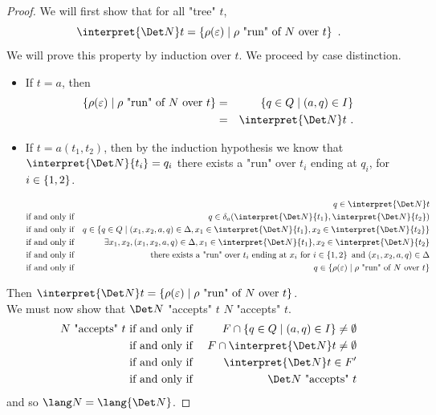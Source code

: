 \documentclass[twoside]{article}
\begin{document}
\begin{proof}
	We will first show that for all "tree" $t$,
	\[
		\interpret {\Det N} t = \setdef {\rho(\varepsilon)}{\text{$\rho$ "run" of~$N$ over~$t$}}\ .
	\]
	We will prove this property by induction over $t$. We proceed by case distinction.
	\begin{itemize}
		\item If $t = a$, then
		      \begin{eqnarray*}
			      \setdef {\rho(\varepsilon)}{\text{$\rho$ "run" of~$N$ over~$t$}} &=&  \setdef {q \in Q} {(a,q) \in I} \\
			      &=& \interpret {\Det N} t\ .
		      \end{eqnarray*}
		\item If $t = a(t_1,t_2)$, then
		      by the induction hypothesis we know that
		      $\interpret {\Det N} {t_i} = q_i$ \tiff there exists a "run" over $t_i$ ending at $q_i$, for $i \in \left\{1,2\right\}$.

		      \begin{eqnarray*}
			      &&q \in \interpret {\Det N} t \\
			      &\text{if and only if}& q \in \delta_a (\interpret {\Det N} {t_1}, \interpret {\Det N} {t_2}) \\
			      &\text{if and only if}& q \in \setdef {q \in  Q} {(x_1,x_2,a,q) \in \Delta, x_1 \in \interpret {\Det N} {t_1}, x_2 \in \interpret {\Det N} {t_2}} \\
			      &\text{if and only if}& \exists x_1,x_2, (x_1,x_2,a,q) \in \Delta, x_1 \in \interpret {\Det N} {t_1}, x_2 \in \interpret {\Det N} {t_2} \\
			      &\text{if and only if}& \text{there exists a "run" over }  t_i  \text { ending at } x_i \text { for  } i \in \set {1,2} \text{ and } (x_1,x_2,a,q) \in \Delta\\
			      &\text{if and only if}& q \in \setdef {\rho(\varepsilon)}{\text{$\rho$ "run" of~$N$ over~$t$}}
		      \end{eqnarray*}
	\end{itemize}
	Then $ \interpret {\Det N} t = \setdef {\rho(\varepsilon)}{\text{$\rho$ "run" of~$N$ over~$t$}}$.\\

	We must now show that $\Det N$ "accepts" $t$ \tiff $N$ "accepts" $t$.
	\begin{eqnarray*}
		N \text{ "accepts" } t &\tiff& F \cap \setdef {q \in Q} {(a,q) \in I} \neq \emptyset \\
		&\tiff&   F \cap  \interpret {\Det N} t \neq \emptyset \\
		&\tiff& \interpret {\Det N} t  \in F' \\
		&\tiff& {\Det N} \text{ "accepts" } t
	\end{eqnarray*}
	and so $\lang N = \lang {\Det N}$.
\end{proof}
\end{document}
